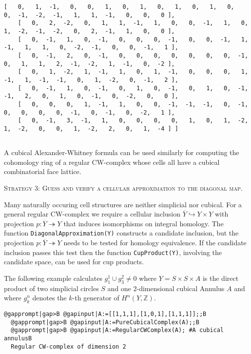 \documentclass[a4paper,11pt]{report}
\begin{document}
{{\begin{Verbatim}[commandchars=!@|,fontsize=\small,frame=single,label=Example]
    [   0,   1,  -1,   0,   0,   1,   0,   1,   0,   1,   0,   1,   0,   0,  -1,  -2,  -1,   1,   1,  -1,   0,   0,   0 ],
    [   0,   2,  -2,   0,   1,   1,  -1,   1,   0,   0,  -1,   1,   0,   1,  -2,  -1,  -2,   0,   2,  -1,   1,   0,   0 ],
    [   0,  -1,   1,   0,  -1,   0,   0,   0,  -1,   0,   0,  -1,   1,  -1,   1,   1,   0,  -2,  -1,   0,   0,  -1,   1 ],
    [   0,  -1,   2,   0,  -1,   0,   0,   0,   0,   0,   0,   0,  -1,   0,   1,   1,   2,  -1,  -2,   1,  -1,   0,  -2 ],
    [   0,   1,  -2,   1,  -1,   1,   0,   1,  -1,   0,   0,   0,   1,  -1,   1,  -1,  -1,   0,   1,  -2,   0,  -1,   2 ],
    [   0,  -1,   1,   0,  -1,   0,   1,   0,  -1,   0,   1,   0,  -1,  -1,   2,   0,   1,   0,  -1,   0,  -2,   0,   0 ],
    [   0,   0,   0,   1,  -1,   1,   0,   0,  -1,  -1,  -1,   0,  -1,   0,   0,   0,   0,  -1,   0,  -1,   0,  -2,   1 ],
    [   0,  -1,   3,  -1,   1,   0,   0,   0,   0,   1,   0,   1,  -2,   1,  -2,   0,   0,   1,  -2,   2,   0,   1,  -4 ] ]
  
\end{Verbatim}
 A cubical Alexander-Whitney formula can be used similarly for computing the
cohomology ring of a regular CW-complex whose cells all have a cubical
combinatorial face lattice. 

\textsc{Strategy 3: Guess and verify a cellular approximation to the diagonal map.} 

Many naturally occuring cell structures are neither simplicial nor cubical.
For a general regular CW-complex we require a cellular inclusion $\overline Y \hookrightarrow Y\times Y$ with projection $p\colon \overline Y \twoheadrightarrow Y$ that induces isomorphisms on integral homology. The function \texttt{DiagonalApproximation(Y)} constructs a candidate inclusion, but the projection $p\colon \overline Y \twoheadrightarrow Y$ needs to be tested for homology equivalence. If the candidate inclusion passes
this test then the function \texttt{CupProduct(Y)}, involving the candidate space, can be used for cup products. 

The following example calculates $g_1^1 \cup g_3^2 \ne 0$ where $Y=S\times S\times A$ is the direct product of two simplicial circles $S$ and one $2$-dimensional cubical Annulus $A$ and where $g_k^n$ denotes the $k$-th generator of $H^n(Y,\mathbb Z)$. 
\begin{Verbatim}[commandchars=@|B,fontsize=\small,frame=single,label=Example]
  @gapprompt|gap>B @gapinput|A:=[[1,1,1],[1,0,1],[1,1,1]];;B
  @gapprompt|gap>B @gapinput|A:=PureCubicalComplex(A);;B
  @gapprompt|gap>B @gapinput|A:=RegularCWComplex(A); #A cubical annulusB
  Regular CW-complex of dimension 2
  

\end{Verbatim}}}
\end{document}
